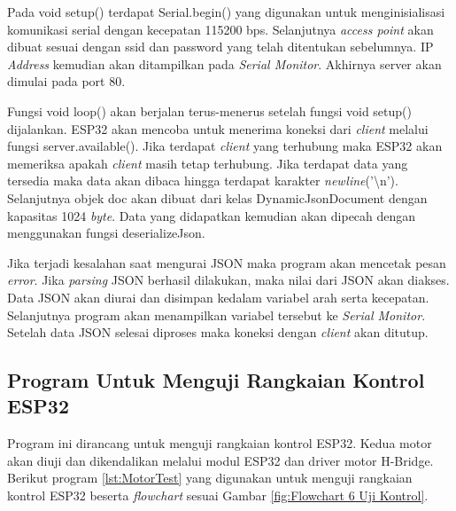 Pada void setup() terdapat Serial.begin() yang digunakan untuk menginisialisasi komunikasi serial dengan kecepatan 115200 bps. Selanjutnya \emph{access point} akan dibuat sesuai dengan ssid dan password yang telah ditentukan sebelumnya. IP \emph{Address} kemudian akan ditampilkan pada \emph{Serial Monitor}. Akhirnya server akan dimulai pada port 80.

Fungsi void loop() akan berjalan terus-menerus setelah fungsi void setup() dijalankan. ESP32 akan mencoba untuk menerima koneksi dari \emph{client} melalui fungsi server.available(). Jika terdapat \emph{client} yang terhubung maka ESP32 akan memeriksa apakah \emph{client} masih tetap terhubung. Jika terdapat data yang tersedia maka data akan dibaca hingga terdapat karakter \emph{newline}('\textbackslash n'). Selanjutnya objek doc akan dibuat dari kelas DynamicJsonDocument dengan kapasitas 1024 \emph{byte}. Data yang didapatkan kemudian akan dipecah dengan menggunakan fungsi deserializeJson.

Jika terjadi kesalahan saat mengurai JSON maka program akan mencetak pesan \emph{error}. Jika \emph{parsing} JSON berhasil dilakukan, maka nilai dari JSON akan diakses. Data JSON akan diurai dan disimpan kedalam variabel arah serta kecepatan. Selanjutnya program akan menampilkan variabel tersebut ke \emph{Serial Monitor}. Setelah data JSON selesai diproses maka koneksi dengan \emph{client} akan ditutup.

\subsection{Program Untuk Menguji Rangkaian Kontrol ESP32}

Program ini dirancang untuk menguji rangkaian kontrol ESP32. Kedua motor akan diuji dan dikendalikan melalui modul ESP32 dan driver motor H-Bridge. Berikut program \ref{lst:MotorTest} yang digunakan untuk menguji rangkaian kontrol ESP32 beserta \emph{flowchart} sesuai Gambar \ref{fig:Flowchart 6 Uji Kontrol}.

